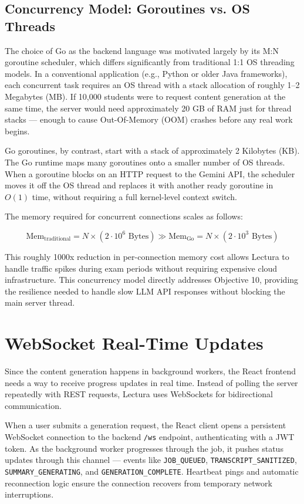 \subsection{Concurrency Model: Goroutines vs. OS Threads}
The choice of Go as the backend language was motivated largely by its M:N goroutine scheduler, which differs significantly from traditional 1:1 OS threading models. In a conventional application (e.g., Python or older Java frameworks), each concurrent task requires an OS thread with a stack allocation of roughly 1--2 Megabytes (MB). If 10,000 students were to request content generation at the same time, the server would need approximately 20 GB of RAM just for thread stacks — enough to cause Out-Of-Memory (OOM) crashes before any real work begins.

Go goroutines, by contrast, start with a stack of approximately 2 Kilobytes (KB). The Go runtime maps many goroutines onto a smaller number of OS threads. When a goroutine blocks on an HTTP request to the Gemini API, the scheduler moves it off the OS thread and replaces it with another ready goroutine in $O(1)$ time, without requiring a full kernel-level context switch.

The memory required for concurrent connections scales as follows:

\begin{equation}
    \text{Mem}_{\text{traditional}} = N \times (2 \cdot 10^6 \text{ Bytes}) \gg \text{Mem}_{\text{Go}} = N \times (2 \cdot 10^3 \text{ Bytes})
\end{equation}

This roughly 1000x reduction in per-connection memory cost allows Lectura to handle traffic spikes during exam periods without requiring expensive cloud infrastructure. This concurrency model directly addresses Objective 10, providing the resilience needed to handle slow LLM API responses without blocking the main server thread.

\section{WebSocket Real-Time Updates}
Since the content generation happens in background workers, the React frontend needs a way to receive progress updates in real time. Instead of polling the server repeatedly with REST requests, Lectura uses WebSockets for bidirectional communication.

When a user submits a generation request, the React client opens a persistent WebSocket connection to the backend \texttt{/ws} endpoint, authenticating with a JWT token. As the background worker progresses through the job, it pushes status updates through this channel — events like \texttt{JOB\_QUEUED}, \texttt{TRANSCRIPT\_SANITIZED}, \texttt{SUMMARY\_GENERATING}, and \texttt{GENERATION\_COMPLETE}. Heartbeat pings and automatic reconnection logic ensure the connection recovers from temporary network interruptions.

